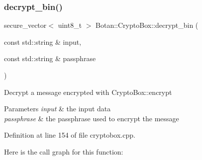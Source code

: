 \subsubsection{\texorpdfstring{decrypt\+\_\+bin()}{decrypt\_bin()}\hspace{0.1cm}{\footnotesize\ttfamily [2/2]}}
{\footnotesize\ttfamily secure\+\_\+vector$<$ uint8\+\_\+t $>$ Botan\+::\+Crypto\+Box\+::decrypt\+\_\+bin (\begin{DoxyParamCaption}\item[{const std\+::string \&}]{input,  }\item[{const std\+::string \&}]{passphrase }\end{DoxyParamCaption})}

Decrypt a message encrypted with Crypto\+Box\+::encrypt 
\begin{DoxyParams}{Parameters}
{\em input} & the input data \\
\hline
{\em passphrase} & the passphrase used to encrypt the message \\
\hline
\end{DoxyParams}


Definition at line 154 of file cryptobox.\+cpp.

Here is the call graph for this function\+:
